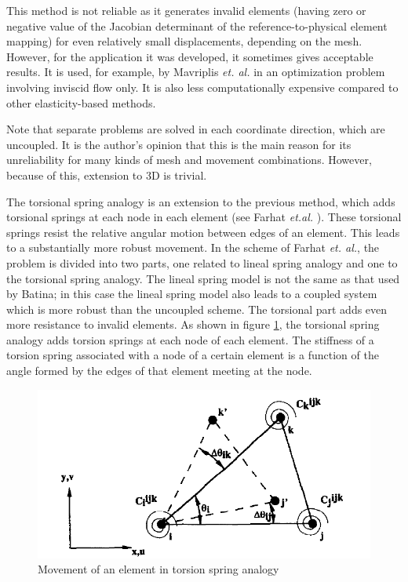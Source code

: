  This method is not reliable as it generates invalid elements (having zero or negative value of the Jacobian determinant of the reference-to-physical element mapping) for even relatively small displacements, depending on the mesh. However, for the application it was developed, it sometimes gives acceptable results. It is used, for example, by Mavriplis \emph{et. al.} \cite{appl:mavriplis} in an optimization problem involving inviscid flow only. It is also less computationally expensive compared to other elasticity-based methods.
 
 Note that separate problems are solved in each coordinate direction, which are uncoupled. It is the author's opinion that this is the main reason for its unreliability for many kinds of mesh and movement combinations. However, because of this, extension to 3D is trivial.
 
 The torsional spring analogy is an extension to the previous method, which adds torsional springs at each node in each element (see Farhat \emph{et.al.} \cite{mm:torsionsprings}).
 These torsional springs resist the relative angular motion between edges of an element. This leads to a substantially more robust movement. In the scheme of Farhat \emph{et. al.}, the problem is divided into two parts, one related to lineal spring analogy and one to the torsional spring analogy. The lineal spring model is not the same as that used by Batina; in this case the lineal spring model also leads to a coupled system which is more robust than the uncoupled scheme. The torsional part adds even more resistance to invalid elements. As shown in figure \ref{f:torsion}, the torsional spring analogy adds torsion springs at each node of each element. The stiffness of a torsion spring associated with a node of a certain element is a function of the angle formed by the edges of that element meeting at the node.
 
 \begin{figure}
 	\centering
 	\includegraphics[scale=0.25]{torsionspring}
 	\caption{Movement of an element in torsion spring analogy}
 	\label{f:torsion}
 \end{figure}
 
